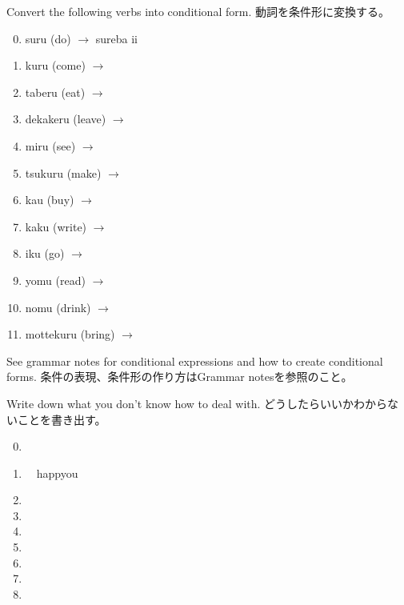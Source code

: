 \documentclass[uplatex,dvipdfmx,b5paper,english,10pt]{jsbook}
\begin{document}
\begin{toiquestion}
\ifEnglish
Convert the following verbs into conditional form.
\else
動詞を条件形に変換する。
\fi
\end{toiquestion}

\begin{multicols}{2}
\begin{enumerate}
 \setcounter{enumi}{-1}
 \item suru (do) $\rightarrow$ sureba ii \hrulefill
 \item kuru (come)   $\rightarrow$ \hrulefill
 \item taberu (eat)   $\rightarrow$ \hrulefill
 \item dekakeru (leave) $\rightarrow$ \hrulefill
 \item miru (see)  $\rightarrow$ \hrulefill
 \item tsukuru (make) $\rightarrow$ \hrulefill
 \item kau (buy)   $\rightarrow$ \hrulefill
 \item kaku (write)  $\rightarrow$ \hrulefill
 \item iku (go)   $\rightarrow$ \hrulefill
 \item yomu (read)   $\rightarrow$ \hrulefill
 \item nomu (drink)   $\rightarrow$ \hrulefill
 \item mottekuru (bring)   $\rightarrow$ \hrulefill
 \end{enumerate}
\end{multicols}

\begin{toianswer}
\ifEnglish
See grammar notes for conditional expressions and how to create conditional forms.
\else
条件の表現、条件形の作り方はGrammar notesを参照のこと。
\fi
\end{toianswer}

\begin{toiquestion}
\ifEnglish
Write down what you don't know how to deal with.
\else
どうしたらいいかわからないことを書き出す。
\fi
\end{toiquestion}

\begin{multicols}{2}
\begin{enumerate}
 \setcounter{enumi}{-1}
 \item \hrulefill
 \vspace{-1.1\baselineskip}
 \item[] \ \ happyou
 \item \hrulefill
 \item \hrulefill
 \item \hrulefill
 \item \hrulefill
 \item \hrulefill
 \item \hrulefill
 \item \hrulefill
\end{enumerate}
\end{multicols}
\end{document}
